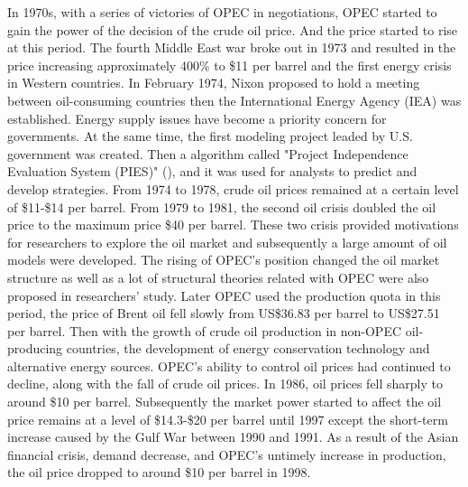 In 1970s, with a series of victories of OPEC in negotiations, OPEC started to gain the power of the decision of the crude oil price. And the price started to rise at this period. The fourth Middle East war broke out in 1973 and resulted in the price increasing approximately 400\% to \$11 per barrel and the first energy crisis in Western countries. In February 1974, Nixon proposed to hold a meeting between oil-consuming countries then the International Energy Agency (IEA) was established. Energy supply issues have become a priority concern for governments. At the same time, the first modeling project leaded by U.S. government was created. Then a algorithm called "Project Independence Evaluation System (PIES)" (\cite{hogan1975energy}), and it was used for analysts to predict and develop strategies. From 1974 to 1978, crude oil prices remained at 
a certain level of \$11-\$14 per barrel. From 1979 to 1981, the second oil crisis doubled the oil price to the maximum price \$40 per barrel. These two crisis provided motivations for researchers to explore the oil market and subsequently a large amount of oil models were developed. The rising of OPEC's position changed the oil market structure as well as a lot of structural theories related with OPEC were also proposed in researchers' study. 
Later OPEC used the production quota in this period, the price of Brent oil fell slowly from US\$36.83 per barrel to US\$27.51 per barrel.
Then with the growth of crude oil production in non-OPEC oil-producing countries, the development of energy conservation technology and alternative energy sources. OPEC's ability to control oil prices had continued to decline, along with the fall of crude oil prices. In 1986, oil prices fell sharply to around \$10 per barrel. Subsequently the market power started to affect the oil price remains at a level of \$14.3-\$20 per barrel until 1997 except the short-term increase caused by the Gulf War between 1990 and 1991. As a result of the Asian financial crisis, demand decrease, and OPEC's untimely increase in production, the oil price dropped to around \$10 per barrel in 1998. 

